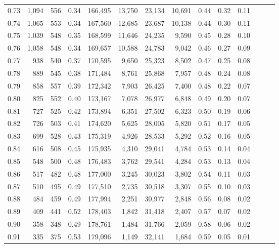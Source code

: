 \begin{tabular}{rrrrrrrrrrrrrr}
0.73 &  1,094 &  556 &  0.34 &  166,495 &   13,750 &  23,134 &  10,691 &  0.44 &  0.32 &      0.11 \\
0.74 &  1,065 &  553 &  0.34 &  167,560 &   12,685 &  23,687 &  10,138 &  0.44 &  0.30 &      0.11 \\
0.75 &  1,039 &  548 &  0.35 &  168,599 &   11,646 &  24,235 &   9,590 &  0.45 &  0.28 &      0.10 \\
0.76 &  1,058 &  548 &  0.34 &  169,657 &   10,588 &  24,783 &   9,042 &  0.46 &  0.27 &      0.09 \\
0.77 &    938 &  540 &  0.37 &  170,595 &    9,650 &  25,323 &   8,502 &  0.47 &  0.25 &      0.08 \\
0.78 &    889 &  545 &  0.38 &  171,484 &    8,761 &  25,868 &   7,957 &  0.48 &  0.24 &      0.08 \\
0.79 &    858 &  557 &  0.39 &  172,342 &    7,903 &  26,425 &   7,400 &  0.48 &  0.22 &      0.07 \\
0.80 &    825 &  552 &  0.40 &  173,167 &    7,078 &  26,977 &   6,848 &  0.49 &  0.20 &      0.07 \\
0.81 &    727 &  525 &  0.42 &  173,894 &    6,351 &  27,502 &   6,323 &  0.50 &  0.19 &      0.06 \\
0.82 &    726 &  503 &  0.41 &  174,620 &    5,625 &  28,005 &   5,820 &  0.51 &  0.17 &      0.05 \\
0.83 &    699 &  528 &  0.43 &  175,319 &    4,926 &  28,533 &   5,292 &  0.52 &  0.16 &      0.05 \\
0.84 &    616 &  508 &  0.45 &  175,935 &    4,310 &  29,041 &   4,784 &  0.53 &  0.14 &      0.04 \\
0.85 &    548 &  500 &  0.48 &  176,483 &    3,762 &  29,541 &   4,284 &  0.53 &  0.13 &      0.04 \\
0.86 &    517 &  482 &  0.48 &  177,000 &    3,245 &  30,023 &   3,802 &  0.54 &  0.11 &      0.03 \\
0.87 &    510 &  495 &  0.49 &  177,510 &    2,735 &  30,518 &   3,307 &  0.55 &  0.10 &      0.03 \\
0.88 &    484 &  459 &  0.49 &  177,994 &    2,251 &  30,977 &   2,848 &  0.56 &  0.08 &      0.02 \\
0.89 &    409 &  441 &  0.52 &  178,403 &    1,842 &  31,418 &   2,407 &  0.57 &  0.07 &      0.02 \\
0.90 &    358 &  348 &  0.49 &  178,761 &    1,484 &  31,766 &   2,059 &  0.58 &  0.06 &      0.02 \\
0.91 &    335 &  375 &  0.53 &  179,096 &    1,149 &  32,141 &   1,684 &  0.59 &  0.05 &      0.01 \\

\end{tabular}

